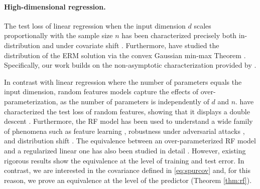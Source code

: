 \vspace{-0.2cm}

\paragraph{High-dimensional regression.}
The test loss of linear regression when the input dimension $d$ scales proportionally with the sample size $n$ has been 
characterized precisely both in-distribution  \cite{hastie2019surprises, cheng2024dimension} and under covariate shift \cite{yang2023precise, mallinar2024minimumnorm,song2024generalization}. Furthermore, 
\cite{montanari2019generalization,chang2021provable,han2023distribution} have studied the distribution of the ERM solution via %
the convex Gaussian min-max Theorem %
\cite{thrampoulidis2015regularized}. %
Specifically, our work builds on the non-asymptotic characterization provided by \cite{han2023distribution}. 

\vspace{-0.1cm}

In contrast with linear regression where the number of parameters equals the input dimension, random features models \cite{rahimi2007random} %
capture the effects of over-parameterization, as the number of parameters is independently of $d$ and $n$.
\cite{mei2022generalization} have characterized the test loss of random features, showing that it displays a double descent \cite{Belkin19}. Furthermore, the RF model has been used to understand a wide family of phenomena such as feature learning \cite{ba2022highdimensional, damian2022neural, moniri2023theory}, robustness under adversarial attacks \cite{dohmatob2022non, bombari2023universal, hassani2024curse}, and distribution shift \cite{tripuraneni2021overparameterization, lee2023demystifying}. The equivalence between an over-parameterized RF model and a regularized linear one has also been studied in detail %
\cite{goldt2022gaussian, goldt2020modeling, hu23universality, montanari2022universality}. However, existing rigorous results show the equivalence at the level of training and test error. In contrast, we are interested in the covariance defined in \eqref{eq:spurcov} and, for this reason, we prove an equivalence at the level of the predictor (Theorem \ref{thm:rf}). %



